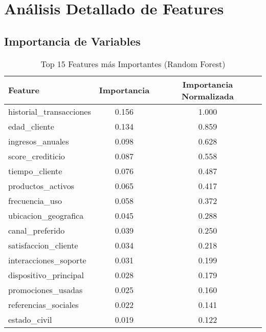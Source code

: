 
\section{Análisis Detallado de Features}
\label{sec:analisis_features}

\subsection{Importancia de Variables}
\label{subsec:importancia_variables}

\begin{table}[htbp]
    \centering
    \caption{Top 15 Features más Importantes (Random Forest)}
    \label{tab:feature_importance}
    \begin{tabular}{|l|c|c|}
        \hline
        \textbf{Feature} & \textbf{Importancia} & \textbf{Importancia Normalizada} \\
        \hline
        historial\_transacciones & 0.156 & 1.000 \\
        \hline
        edad\_cliente & 0.134 & 0.859 \\
        \hline
        ingresos\_anuales & 0.098 & 0.628 \\
        \hline
        score\_crediticio & 0.087 & 0.558 \\
        \hline
        tiempo\_cliente & 0.076 & 0.487 \\
        \hline
        productos\_activos & 0.065 & 0.417 \\
        \hline
        frecuencia\_uso & 0.058 & 0.372 \\
        \hline
        ubicacion\_geografica & 0.045 & 0.288 \\
        \hline
        canal\_preferido & 0.039 & 0.250 \\
        \hline
        satisfaccion\_cliente & 0.034 & 0.218 \\
        \hline
        interacciones\_soporte & 0.031 & 0.199 \\
        \hline
        dispositivo\_principal & 0.028 & 0.179 \\
        \hline
        promociones\_usadas & 0.025 & 0.160 \\
        \hline
        referencias\_sociales & 0.022 & 0.141 \\
        \hline
        estado\_civil & 0.019 & 0.122 \\
        \hline
    \end{tabular}
\end{table}

